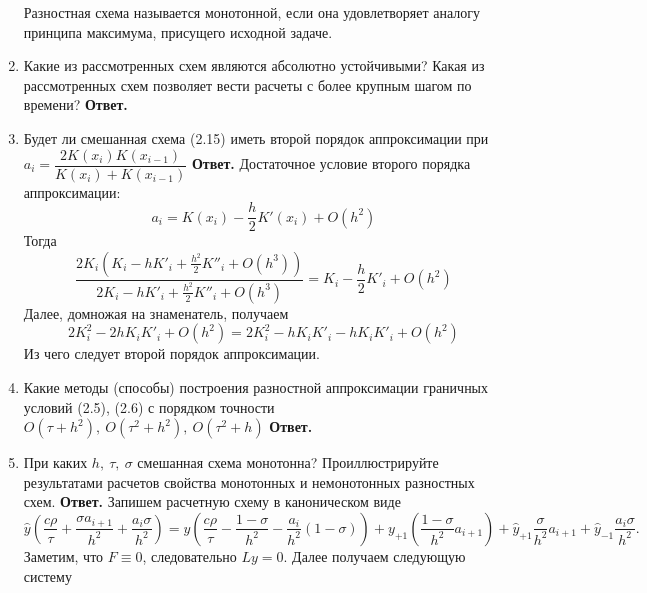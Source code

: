 \documentclass{article}
\begin{document}
\begin{enumerate}
		 Разностная схема называется монотонной, если она удовлетворяет аналогу принципа максимума, присущего
		 исходной задаче.
		\item Какие из рассмотренных схем являются абсолютно устойчивыми? Какая из рассмотренных схем позволяет вести
		расчеты с более крупным шагом по времени?
		\newline 
		{\bfseries Ответ. } 
		\item Будет ли смешанная схема (2.15) иметь второй порядок
		аппроксимации при $a_i = \dfrac{2 K(x_i) K(x_{i-1})}{K(x_i) + K(x_{i-1})}$
		\newline
		{\bfseries Ответ. } 
		Достаточное условие второго порядка аппроксимации:
		\begin{equation*}
			a_i = K(x_i) - \frac{h}{2}K'(x_i) + O(h^2)
		\end{equation*}
		Тогда 
		\begin{equation*}
			\frac{2K_i(K_i - h K'_i + \frac{h^2}{2}K''_i + O(h^3))}{2K_i - h K'_i + \frac{h^2}{2} K''_i + O(h^3)}=
			K_i - \frac{h}{2}K'_i + O(h^2)
		\end{equation*}
		Далее, домножая на знаменатель, получаем 
		\begin{equation*}
			2 K^2_i - 2 h K_i K'_i  + O(h^2) = 2 K^2_i - h K_i K'_i - h K_i K'_i + O(h^2)
		\end{equation*}
		Из чего следует второй порядок аппроксимации.
		\item Какие методы (способы) построения разностной аппроксимации граничных условий 
		(2.5), (2.6) с порядком точности $O(\tau + h^2), \ O(\tau^2 + h^2), \ O(\tau^2 + h)$
		\newline
		{\bfseries Ответ. } 
		\item При каких $h, \ \tau, \ \sigma$ смешанная схема монотонна? Проиллюстрируйте результатами расчетов свойства монотонных
		и немонотонных разностных схем.
		\newline
		{\bfseries Ответ. } 
		Запишем расчетную схему в каноническом виде 
		\begin{equation*}
			\hat{y} (\frac{c \rho }{\tau} + \frac{\sigma a_{i+1}}{h^2} + \frac{a_i \sigma}{h^2}) 
			= y \left(\frac{c \rho}{\tau}- \frac{1-\sigma}{h^2} - \frac{a_i}{h^2}(1-\sigma)\right) 
			+ y_{+1} \left(\frac{1-\sigma}{h^2}a_{i+1}\right) + \hat{y}_{+1} \frac{\sigma}{h^2} a_{i+1}
			+ \hat{y}_{-1} \frac{a_i \sigma}{h^2}.
		\end{equation*}
		Заметим, что $F \equiv 0$, следовательно $Ly = 0$.
		Далее получаем следующую систему 
		\begin{equation*}

\end{equation*}
\end{enumerate}
\end{document}
